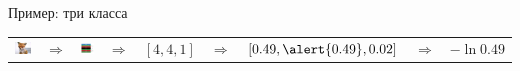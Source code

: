 \documentclass[notes,12pt, aspectratio=169]{beamer}
\newenvironment{wideitemize}{\itemize\addtolength{\itemsep}{10pt}}{\enditemize}
\begin{document}
\begin{frame}{Пример: три класса}
\begin{tabular}{m{2.5cm} m{0.35cm} m{1.8cm} m{0.35cm} m{1cm} m{0.35cm} m{2.7cm} m{0.5cm} m{1.5cm}}
\includegraphics[scale=0.2]{tab_fox.png} & {\Large $\Rightarrow$} & \includegraphics[scale=0.2]{tab_nn.png}  &  {\Large $\Rightarrow$} &  $[4, 4, 1]$ &  {\Large $\Rightarrow$} &  $[0.49, \alert{0.49}, 0.02]$ & {\Large $\Rightarrow$}  & $-\ln 0.49$\\
\end{tabular}
\end{frame}


%
%
%
%
%
\end{document}
